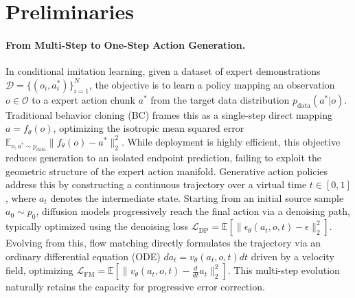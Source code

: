 \section{Preliminaries}

\paragraph{From Multi-Step to One-Step Action Generation.}
In conditional imitation learning, given a dataset of expert demonstrations \(\mathcal{D} = \{(o_i, a^*_i)\}_{i=1}^N\), 
the objective is to learn a policy mapping an observation \(o \in \mathcal{O}\) to a expert action chunk \(a^*\) 
from the target data distribution \(p_{\text{data}}(a^* | o)\). 
Traditional behavior cloning (BC) frames this as a single-step direct mapping \(a = f_\theta(o)\), 
optimizing the isotropic mean squared error \(\mathbb{E}_{o, a^* \sim p_{\text{data}}} \|f_\theta(o) - a^*\|_2^2\). 
While deployment is highly efficient, this objective reduces generation to an isolated endpoint prediction, 
failing to exploit the geometric structure of the expert action manifold.
Generative action policies address this by constructing a continuous trajectory over a virtual time \(t \in [0, 1]\), 
where \(a_t\) denotes the intermediate state. Starting from an initial source sample \(a_0 \sim p_0\), 
diffusion models progressively reach the final action via a denoising path, 
typically optimized using the denoising loss \(\mathcal{L}_{\text{DP}} = \mathbb{E}[\|\epsilon_\theta(a_t, o, t) - \epsilon\|_2^2]\). 
Evolving from this, flow matching directly formulates the trajectory via an ordinary differential equation (ODE) 
\(da_t = v_\theta(a_t, o, t) dt\) driven by a velocity field, 
optimizing \(\mathcal{L}_{\text{FM}} = \mathbb{E}[\|v_\theta(a_t, o, t) - \frac{d}{dt}a_t\|_2^2]\). 
This multi-step evolution naturally retains the capacity for progressive error correction.

